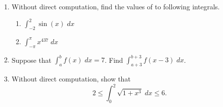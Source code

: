 \documentclass[11pt]{article}
\begin{document}
\begin{enumerate}
\item Without direct computation, find the values of to following
  integrals.
  \begin{enumerate}
  \item $\displaystyle\int_{-2}^2\sin(x)\;dx$
    \vfill
  \item $\displaystyle\int_{-\pi}^\pi x^{437}\;dx$
    \vfill
  \end{enumerate}

\item Suppose that $\displaystyle\int_a^b f(x)\; dx = 7$. Find
  $\displaystyle\int_{a+3}^{b+3} f(x-3)\; dx$.
  \vfill

  \newpage

\item Without direct computation, show that
  \[
  2\leq \int_0^2 \sqrt{1+x^3}\; dx \leq 6.
  \]

\end{enumerate}
\end{document}
